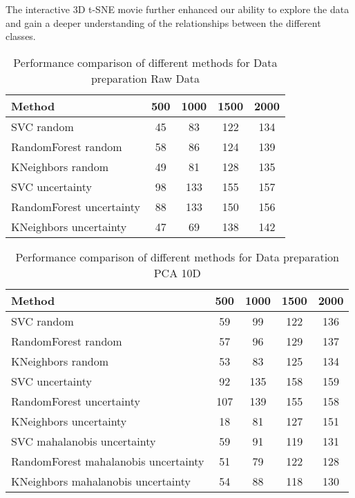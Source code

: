 The interactive 3D t-SNE movie further enhanced our ability to explore the data and gain a deeper understanding of the relationships between the different classes.
\begin{table}[htbp]
    \centering
    \begin{tabular}{|l|c|c|c|c|}
    \hline
    \textbf{Method} & \textbf{500} & \textbf{1000} & \textbf{1500} & \textbf{2000} \\
    \hline
    SVC random & 45 & 83 & 122 & 134 \\
    RandomForest random & 58 & 86 & 124 & 139 \\
    KNeighbors random & 49 & 81 & 128 & 135 \\
    SVC uncertainty & 98 & 133 & 155 & 157 \\
    RandomForest uncertainty & 88 & 133 & 150 & 156 \\
    KNeighbors uncertainty & 47 & 69 & 138 & 142 \\
    \hline
    \end{tabular}
    \caption{Performance comparison of different methods for Data preparation Raw Data}
    \label{tab:raw_data}
\end{table}

\begin{table}[htbp]
    \centering
    \begin{tabular}{|l|c|c|c|c|}
    \hline
    \textbf{Method} & \textbf{500} & \textbf{1000} & \textbf{1500} & \textbf{2000} \\
    \hline
    SVC random & 59 & 99 & 122 & 136 \\
    RandomForest random & 57 & 96 & 129 & 137 \\
    KNeighbors random & 53 & 83 & 125 & 134 \\
    SVC uncertainty & 92 & 135 & 158 & 159 \\
    RandomForest uncertainty & 107 & 139 & 155 & 158 \\
    KNeighbors uncertainty & 18 & 81 & 127 & 151 \\
    SVC mahalanobis uncertainty & 59 & 91 & 119 & 131 \\
    RandomForest mahalanobis uncertainty & 51 & 79 & 122 & 128 \\
    KNeighbors mahalanobis uncertainty & 54 & 88 & 118 & 130 \\
    \hline
    \end{tabular}
    \caption{Performance comparison of different methods for Data preparation PCA 10D}
    \label{tab:pca_10d}
\end{table}


